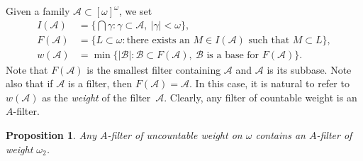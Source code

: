 \documentclass[a4paper,12pt]{amsart}
\newtheorem{proposition}{Proposition}[section]
\theoremstyle{definition}
\theoremstyle{remark}
\begin{document}
Given a family $\mathscr A\subset [\omega]^\omega$, we set 
\begin{align*}
I(\mathscr A) &=\{\textstyle\bigcap\gamma: \gamma\subset \mathscr A,\ |\gamma|<\omega\},\\ 
F(\mathscr A) &=\{L\subset\omega: \text{there exists an $M\in I(\mathscr A)$ such that $M\subset L$}\},\\ 
w(\mathscr A)&=\min\{|\mathscr B|: \mathscr B\subset F(\mathscr A),\ \mathscr B \text{ is a base for } 
F(\mathscr A)\}. 
\end{align*}
Note that $F(\mathscr A)$ is the smallest filter containing $\mathscr A$ and $\mathscr A$ is its subbase. Note 
also that if $\mathscr A$ is a filter, then $F(\mathscr A)=\mathscr A$. In this case, it is natural to refer to 
$w(\mathscr A)$ as the \emph{weight} of the filter~$\mathscr A$. Clearly, any filter of countable weight is an 
$A$-filter.

\begin{proposition}
\label{Proposition_4.5}
Any  $A$-filter of uncountable weight on $\omega$ contains an $A$-filter 
of weight $\omega_2$. 
\end{proposition}
\end{document}
